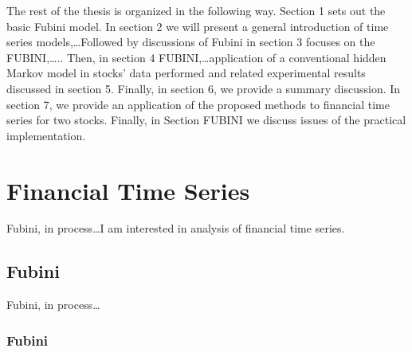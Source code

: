 \documentclass[a4paper,11pt,english]{article}
\begin{document}
	The rest of the thesis is organized in the following way. Section 1 sets out the basic Fubini model. In section 2 we will present a general 
	introduction 
	of time series models,\ldots Followed by discussions of Fubini in section 3 focuses on the  FUBINI,\ldots.. Then, in section 4  
	FUBINI,\ldots application of a conventional hidden Markov model in stocks' data performed and related experimental results discussed in 
	section 5. Finally, in section 6, we provide a summary discussion. In section 7, we provide an application of the 
	proposed methods to financial time series for two stocks. Finally, in Section FUBINI we discuss issues of the practical implementation.		
	
	
			

	\section{Financial Time Series}
		
		Fubini, in process\ldots I am interested in analysis of financial time series.
		
		\subsection{Fubini}
		
		Fubini, in process\ldots

			\subsubsection{Fubini}
			
\end{document}
